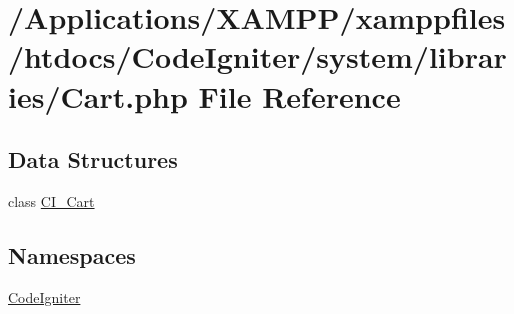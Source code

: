 \hypertarget{_cart_8php}{}\section{/\+Applications/\+X\+A\+M\+P\+P/xamppfiles/htdocs/\+Code\+Igniter/system/libraries/\+Cart.php File Reference}
\label{_cart_8php}
\subsection*{Data Structures}
\begin{DoxyCompactItemize}
\item 
class \mbox{\hyperlink{class_c_i___cart}{C\+I\+\_\+\+Cart}}
\end{DoxyCompactItemize}
\subsection*{Namespaces}
\begin{DoxyCompactItemize}
\item 
 \mbox{\hyperlink{namespace_code_igniter}{Code\+Igniter}}
\end{DoxyCompactItemize}
